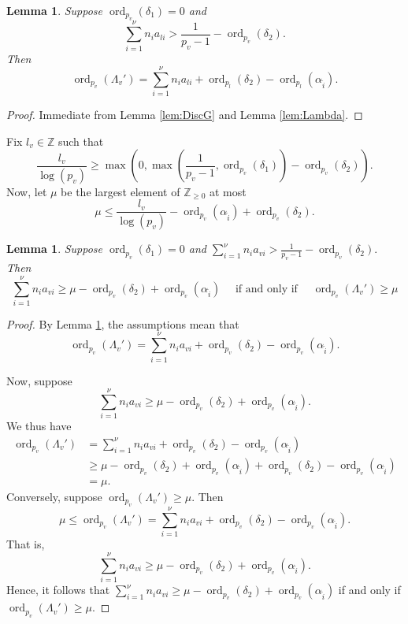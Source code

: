 \documentclass[11pt]{report}
\newtheorem{lemma}[theorem]{Lemma}
\theoremstyle{definition}
\DeclareMathOperator{\ord}{ord}
\begin{document}
\begin{lemma} \label{Lem:19.1}
Suppose $\ord_{p_v}(\delta_1) = 0$ and
\[\sum_{i = 1}^{\nu} n_{i}a_{li} > \frac{1}{p_v-1} - \ord_{p_v}(\delta_2).\]
Then
\[\ord_{p_v}(\Lambda_v') = \sum_{i = 1}^{\nu} n_{i}a_{li} + \ord_{p_l}(\delta_2) - \ord_{p_l}(\alpha_{\hat{i}}).\]
\end{lemma}

\begin{proof}
Immediate from Lemma \ref{lem:DiscG} and Lemma \ref{lem:Lambda}.
\end{proof}

Fix $l_v \in \mathbb{Z}$ such that
\[\frac{l_v}{\log(p_v)} \geq \max\left(0,\max\left( \frac{1}{p_v-1}, \ord_{p_v}(\delta_1)\right) - \ord_{p_v}(\delta_2)\right).\]
Now, let $\mu$ be the largest element of $\mathbb{Z}_{\geq 0}$ at most
\[\mu \leq \frac{l_v}{\log(p_v)} - \ord_{p_v}(\alpha_{\hat{i}}) + \ord_{p_v}(\delta_2).\]

\begin{lemma}
  \label{lem:lambdap}
  Suppose $\ord_{p_v}(\delta_1) = 0$ and $\displaystyle \sum_{i = 1}^{\nu} n_{i}a_{vi} > \frac{1}{p_v-1} - \ord_{p_v}(\delta_2).$
  Then
  \[ \sum_{i = 1}^{\nu} n_{i}a_{vi}  \geq \mu - \ord_{p_v}(\delta_2) +
    \ord_{p_v}(\alpha_{\hat{i}}) \quad \text{ if and only if } \quad
    \ord_{p_v}(\Lambda_v') \geq \mu\]
\end{lemma}

\begin{proof}
By Lemma \ref{Lem:19.1}, the assumptions mean that
\[\ord_{p_v}(\Lambda_v') = \sum_{i = 1}^{\nu} n_{i}a_{vi} + \ord_{p_v}(\delta_2) - \ord_{p_v}(\alpha_{\hat{i}}).\]

Now, suppose
\[\sum_{i = 1}^{\nu} n_{i}a_{vi}  \geq \mu - \ord_{p_v}(\delta_2) + \ord_{p_v}(\alpha_{\hat{i}}).\]
We thus have
\begin{align*}
\ord_{p_v}(\Lambda_v')
	& = \sum_{i = 1}^{\nu} n_{i}a_{vi} + \ord_{p_v}(\delta_2) - \ord_{p_v}(\alpha_{\hat{i}})\\
	& \geq  \mu - \ord_{p_v}(\delta_2) + \ord_{p_v}(\alpha_{\hat{i}}) + \ord_{p_v}(\delta_2) - \ord_{p_v}(\alpha_{\hat{i}})\\
	& = \mu.
\end{align*}
Conversely, suppose $\ord_{p_v}(\Lambda_v') \geq \mu$. Then
\[\mu \leq \ord_{p_v}(\Lambda_v') = \sum_{i = 1}^{\nu} n_{i}a_{vi} + \ord_{p_v}(\delta_2) - \ord_{p_v}(\alpha_{\hat{i}}).\]
That is,
\[\sum_{i = 1}^{\nu} n_{i}a_{vi} \geq \mu - \ord_{p_v}(\delta_2) + \ord_{p_v}(\alpha_{\hat{i}}).\]
Hence, it follows that $\displaystyle \sum_{i = 1}^{\nu} n_{i}a_{vi} \geq \mu - \ord_{p_v}(\delta_2) + \ord_{p_v}(\alpha_{\hat{i}})$ if and only if $\ord_{p_v}(\Lambda_v') \geq \mu$.
\end{proof}
\end{document}
